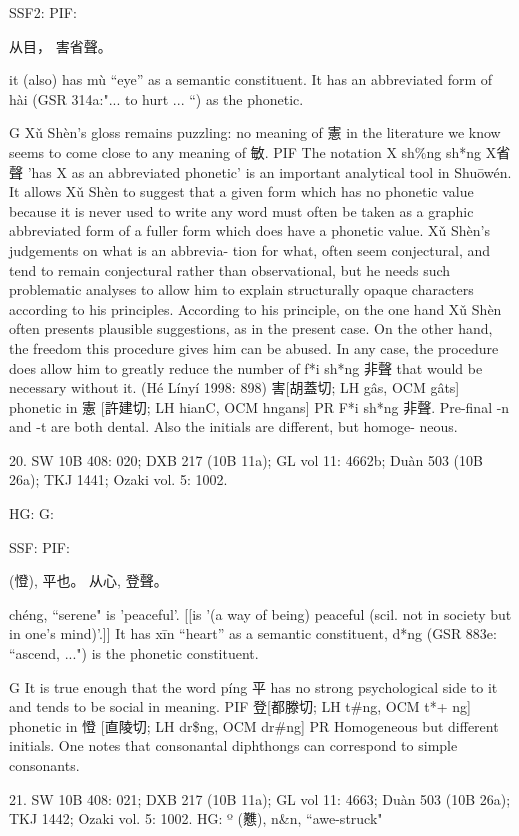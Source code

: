 SSF2: PIF:

从目， 害省聲。

it (also) has mù ``eye'' as a semantic constituent.
It has an abbreviated form of hài (GSR 314a:"... to hurt ... ``) as the phonetic.

G Xǔ Shèn's gloss remains puzzling: no meaning of 憲 in the literature we know seems to come close to any meaning of 敏.
PIF The notation X sh\%ng sh*ng X省聲 'has X as an abbreviated phonetic' is an important analytical tool in Shuōwén. It allows Xǔ Shèn to suggest that a given form which has no phonetic value because it is never used to write any word must often be taken as a graphic abbreviated form of a fuller form which does have a phonetic value. Xǔ Shèn's judgements on what is an abbrevia- tion for what, often seem conjectural, and tend to remain conjectural rather than observational, but he needs such problematic analyses to allow him to explain structurally opaque characters according to his principles. According to his principle, on the one hand Xǔ Shèn often presents plausible suggestions, as in the present case. On the other hand, the freedom this procedure gives him can be abused. In any case, the procedure does allow him to greatly reduce the number of f*i sh*ng 非聲 that would be necessary without it. (Hé Línyí 1998: 898)
害[胡蓋切; LH gâs, OCM gâts] phonetic in 憲 [許建切; LH hianC, OCM hngans]
PR F*i sh*ng 非聲. Pre-final -n and -t are both dental. Also the initials are different, but homoge- neous.


20. SW 10B 408: 020; DXB 217 (10B 11a); GL vol 11: 4662b; Duàn 503 (10B 26a); TKJ 1441; Ozaki vol. 5: 1002.


HG:
G:

SSF: PIF:

(憕),
平也。
从心, 登聲。

chéng, ``serene"
is 'peaceful'. [[is '(a way of being) peaceful (scil. not in society but in one's mind)'.]]
It has xīn ``heart'' as a semantic constituent,
d*ng (GSR 883e: ``ascend, ...") is the phonetic constituent.

G	It is true enough that the word píng 平 has no strong psychological side to it and tends to be social in meaning.
PIF     登[都滕切; LH t\#ng, OCM t*+ ng] phonetic in 憕 [直陵切; LH dr\$ng, OCM dr\#ng]
PR	Homogeneous but different initials. One notes that consonantal diphthongs can correspond to simple consonants.

21. SW 10B 408: 021; DXB 217 (10B 11a); GL vol 11: 4663; Duàn 503 (10B 26a); TKJ 1442; Ozaki vol. 5: 1002.
HG:  º (戁), n&n, ``awe-struck"




